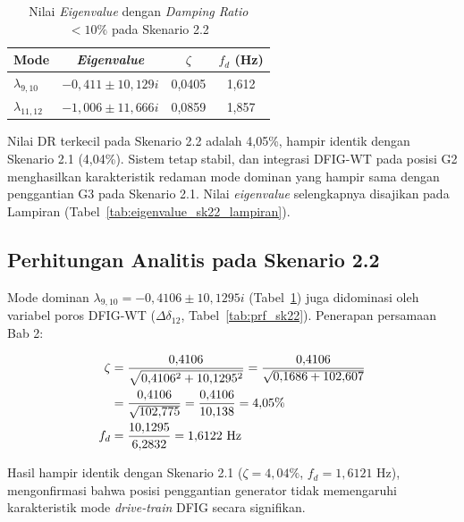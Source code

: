 \begin{table}[h]
	\caption{Nilai \textit{Eigenvalue} dengan \textit{Damping Ratio} $<10\%$
	pada Skenario 2.2}
	\vspace{0.5em}
	\centering
	\fontsize{12}{14.4}\selectfont
	\setlength{\tabcolsep}{6pt}
	\begin{tabular}{>{\centering\arraybackslash}m{1.5cm} c c c}
		\toprule
		\textbf{Mode} & \textbf{\textit{Eigenvalue}} & \textbf{$\zeta$} &
		\textbf{$f_d$ (Hz)} \\
		\midrule
		$\lambda_{9,10}$ & $-0{,}411 \pm 10{,}129i$ & 0,0405 & 1,612 \\
		$\lambda_{11,12}$ & $-1{,}006 \pm 11{,}666i$ & 0,0859 & 1,857 \\
		\bottomrule
	\end{tabular}
	\label{tab:eigenvalue_sk22}
\end{table}

Nilai DR terkecil pada Skenario 2.2 adalah 4,05\%, hampir identik dengan
Skenario 2.1 (4,04\%). Sistem tetap stabil, dan integrasi DFIG-WT pada posisi G2
menghasilkan karakteristik redaman mode dominan yang hampir sama dengan
penggantian G3 pada Skenario 2.1. Nilai \textit{eigenvalue} selengkapnya
disajikan pada Lampiran (Tabel~\ref{tab:eigenvalue_sk22_lampiran}).

\subsection{Perhitungan Analitis pada Skenario 2.2}

Mode dominan $\lambda_{9,10} = -0{,}4106 \pm 10{,}1295i$
(Tabel~\ref{tab:eigenvalue_sk22}) juga didominasi oleh variabel poros
DFIG-WT ($\Delta\delta_{12}$, Tabel~\ref{tab:prf_sk22}). Penerapan
persamaan Bab 2:

\begin{align}
    \zeta &= \frac{0{,}4106}{\sqrt{0{,}4106^2 + 10{,}1295^2}}
           = \frac{0{,}4106}{\sqrt{0{,}1686 + 102{,}607}} \notag \\
          &= \frac{0{,}4106}{\sqrt{102{,}775}}
           = \frac{0{,}4106}{10{,}138} = 4{,}05\% \\
    f_d   &= \frac{10{,}1295}{6{,}2832} = 1{,}6122 \text{ Hz}
\end{align}

Hasil hampir identik dengan Skenario 2.1 ($\zeta = 4{,}04\%$,
$f_d = 1{,}6121$ Hz), mengonfirmasi bahwa posisi penggantian generator
tidak memengaruhi karakteristik mode \textit{drive-train} DFIG secara
signifikan.

